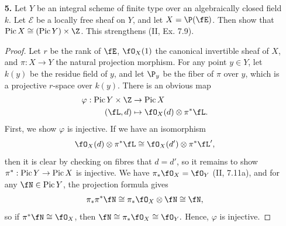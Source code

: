\documentclass[a4paper]{article}
\begin{document}
\begin{enumerate} [label=\textbf{\arabic*.}, leftmargin=0em]
        \begin{proof}
          If $f$ is flat, then $\fL \otimes \fM^{-1}$ is flat over $Y$.
          For each $y \in Y$, $(\fL \otimes \fM^{-1})_y \cong \fO_{X_y}$ on the fibre $X_y$, and each $X_y$ is integral and projective over $k(y)$, so we have $$\cdh^0(X_y, (\fL \otimes \fM^{-1})_y) = \cdh^0(X_y, \fO_{X_y}) = 1.$$
          Thus, $f_*(\fL \otimes \fM^{-1})$ is locally free of rank one on $Y$ (12.9), say $f_*(\fL \otimes \fM^{-1}) = \fN$ for some $\fN \in \pic{Y}$.
          Applying $f^*$ to both sides, and using the fact that the natural morphism
          \begin{equation*}
            f^*f_*(\fL \otimes \fM^{-1}) \to \fL \otimes \fM^{-1}
          \end{equation*}
          is actually an isomorphism because $f_*(\fL \otimes \fM^{-1})$ is locally free of rank one, we obtain our desired isomorphism.
        \end{proof}

  \item[\textbf{5.}] Let $Y$ be an integral scheme of finite type over an algebraically closed field $k$. Let $\mathscr{E}$ be a locally free sheaf on $Y$, and let $X = \P(\fE)$. Then show that $\pic{X} \cong (\pic{Y}) \times \Z$. This strengthens (II, Ex. 7.9).

        \begin{proof}
          Let $r$ be the rank of $\fE$, $\fO_X(1)$ the canonical invertible sheaf of $X$, and $\pi : X \to Y$ the natural projection morphism.
          For any point $y \in Y$, let $k(y)$ be the residue field of $y$, and let $\P_y$ be the fiber of $\pi$ over $y$, which is a projective $r$-space over $k(y)$.
          There is an obvious map
          \begin{align*}
            \varphi : \pic{Y} \times \Z & \to \pic{X}                        \\
            (\fL, d)                    & \mapsto \fO_X(d) \otimes \pi^*\fL.
          \end{align*}
          First, we show $\varphi$ is injective.
          If we have an isomorphism
          \begin{equation*}
            \fO_X(d) \otimes \pi^*\fL \cong \fO_X(d') \otimes \pi^* \fL',
          \end{equation*}
          then it is clear by checking on fibres that $d = d'$, so it remains to show $\pi^* : \operatorname{Pic}{Y} \to \operatorname{Pic}{X}$ is injective.
          We have $\pi_*\fO_X = \fO_Y$ (II, 7.11a), and for any $\fN \in \pic{Y}$, the projection formula gives
          \begin{equation*}
            \pi_*\pi^*\fN \cong \pi_*\fO_X \otimes \fN \cong \fN,
          \end{equation*}
          so if $\pi^*\fN \cong \fO_X$, then \(\fN \cong \pi_*\fO_X \cong \fO_Y.\)
          Hence, $\varphi$ is injective.


\end{proof}
\end{enumerate}
\end{document}
